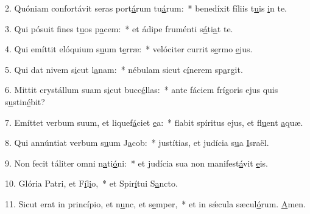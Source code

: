 2. Quóniam confortávit seras port\uline{á}rum tu\uline{á}rum:~* benedíxit fíliis t\uline{u}is \uline{i}n te.\par 
3. Qui pósuit fines t\uline{u}os p\uline{a}cem:~* et ádipe fruménti s\uline{á}ti\uline{a}t te.\par 
4. Qui emíttit elóquium s\uline{u}um t\uline{e}rræ:~* velóciter currit s\uline{e}rmo \uline{e}jus.\par 
5. Qui dat nivem s\uline{i}cut l\uline{a}nam:~* nébulam sicut c\uline{í}nerem sp\uline{a}rgit.\par 
6. Mittit crystállum suam s\uline{i}cut bucc\uline{é}llas:~* ante fáciem frígoris ejus quis s\uline{u}stin\uline{é}bit?\par 
7. Emíttet verbum suum, et liquef\uline{á}ciet \uline{e}a:~* flabit spíritus ejus, et fl\uline{u}ent \uline{a}quæ.\par 
8. Qui annúntiat verbum s\uline{u}um J\uline{a}cob:~* justítias, et judícia s\uline{u}a \uline{I}sraël.\par 
9. Non fecit táliter omni n\uline{a}ti\uline{ó}ni:~* et judícia sua non manifest\uline{á}vit \uline{e}is.\par 
10. Glória Patri, et F\uline{í}l\uline{i}o,~* et Spir\uline{í}tui S\uline{a}ncto.\par 
11. Sicut erat in princípio, et n\uline{u}nc, et s\uline{e}mper,~* et in sǽcula sæcul\uline{ó}rum. \uline{A}men.\par 
